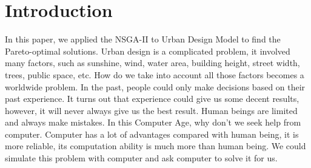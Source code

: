 \chapter{Introduction}
\label{chap:intro}

\iffalse
It's always good to introduce your (1) problem, (2) why it is interesting, (3) what you did, and (4) roughly, 
how well did it work. You might even have citations in here, as in this paper~\cite{Asawa:2008:TDT}.
\fi

In this paper, we applied the NSGA-II to Urban Design Model to find the Pareto-optimal solutions. Urban design is a complicated problem, it involved many factors, such as sunshine, wind, water area, building height, street width, trees, public space, etc. How do we take into account all those factors becomes a worldwide problem. In the past, people could only make decisions based on their past experience. It turns out that experience could give us some decent results, however, it will never always give us the best result. Human beings are limited and always make mistakes. In this Computer Age, why don’t we seek help from computer. Computer has a lot of advantages compared with human being, it is more reliable, its computation ability is much more than human being. We could simulate this problem with computer and ask computer to solve it for us. 


